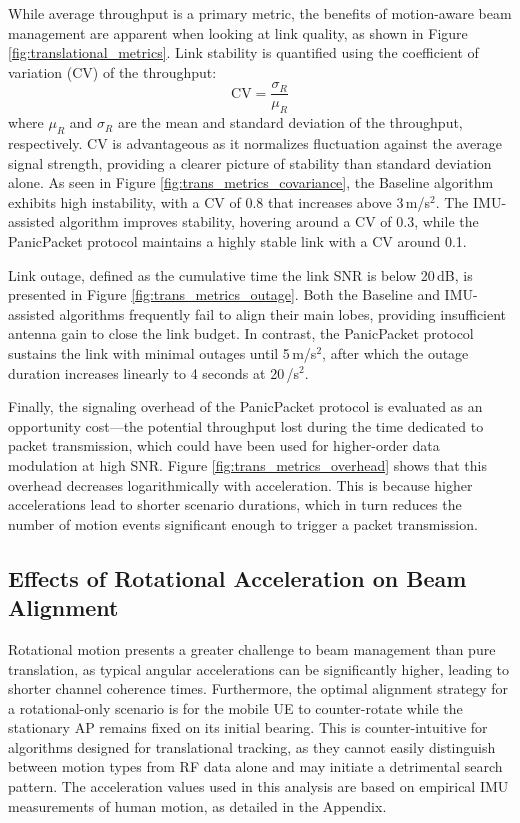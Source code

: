 \documentclass[fleqn,10pt]{wlscirep}
\begin{document}
While average throughput is a primary metric, the benefits of motion-aware beam management are apparent when looking at link quality, as shown in Figure \ref{fig:translational_metrics}. Link stability is quantified using the coefficient of variation (CV) of the throughput:
\begin{equation}
    \text{CV} = \frac{\sigma_R}{\mu_R}
\end{equation}
where $\mu_R$ and $\sigma_R$ are the mean and standard deviation of the throughput, respectively. CV is advantageous as it normalizes fluctuation against the average signal strength, providing a clearer picture of stability than standard deviation alone. As seen in Figure \ref{fig:trans_metrics_covariance}, the Baseline algorithm exhibits high instability, with a CV of 0.8 that increases above 3\,m/s$^2$. The IMU-assisted algorithm improves stability, hovering around a CV of 0.3, while the PanicPacket protocol maintains a highly stable link with a CV around 0.1.

Link outage, defined as the cumulative time the link SNR is below 20\,dB, is presented in Figure \ref{fig:trans_metrics_outage}. Both the Baseline and IMU-assisted algorithms frequently fail to align their main lobes, providing insufficient antenna gain to close the link budget. In contrast, the PanicPacket protocol sustains the link with minimal outages until 5\,m/s$^2$, after which the outage duration increases linearly to 4 seconds at 20\,/s$^2$.

Finally, the signaling overhead of the PanicPacket protocol is evaluated as an opportunity cost—the potential throughput lost during the time dedicated to packet transmission, which could have been used for higher-order data modulation at high SNR. Figure \ref{fig:trans_metrics_overhead} shows that this overhead decreases logarithmically with acceleration. This is because higher accelerations lead to shorter scenario durations, which in turn reduces the number of motion events significant enough to trigger a packet transmission.

\subsection*{Effects of Rotational Acceleration on Beam Alignment}

Rotational motion presents a greater challenge to beam management than pure translation, as typical angular accelerations can be significantly higher, leading to shorter channel coherence times. Furthermore, the optimal alignment strategy for a rotational-only scenario is for the mobile UE to counter-rotate while the stationary AP remains fixed on its initial bearing. This is counter-intuitive for algorithms designed for translational tracking, as they cannot easily distinguish between motion types from RF data alone and may initiate a detrimental search pattern. The acceleration values used in this analysis are based on empirical IMU measurements of human motion, as detailed in the Appendix.
\end{document}

